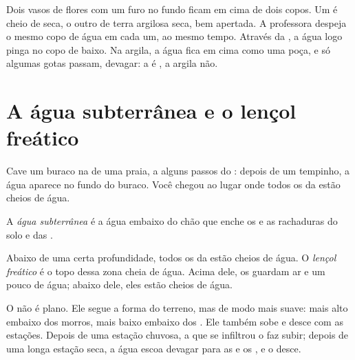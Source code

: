 \begin{inthelab}
Dois vasos de flores com um furo no fundo ficam em cima de dois copos. Um
é cheio de  seca, o outro de terra argilosa seca, bem apertada. A
professora despeja o mesmo copo de água em cada um, ao mesmo tempo. Através
da , a água logo pinga no copo de baixo. Na argila, a água fica em
cima como uma poça, e só algumas gotas passam, devagar: a  é
, a argila não.
\end{inthelab}

\section{A água subterrânea e o lençol freático}

Cave um buraco na  de uma praia, a alguns passos do : depois de um
tempinho, a água aparece no fundo do buraco. Você chegou ao lugar onde
todos os  da  estão cheios de água.

\begin{definition}\label{def:g6:water-underground:groundwater}
A \emph{água subterrânea} é a água embaixo do
chão que enche os  e as rachaduras do solo e das .
\end{definition}

\begin{definition}\label{def:g6:water-underground:water-table}
Abaixo de uma certa profundidade, todos os  da  estão cheios de
água. O \emph{lençol freático} é o topo dessa zona cheia de
água. Acima dele, os  guardam ar e um pouco de água; abaixo dele,
eles estão cheios de água.
\end{definition}

O  não é plano. Ele segue a forma do terreno, mas de modo
mais suave: mais alto embaixo dos morros, mais baixo embaixo dos .
Ele também sobe e desce com as estações. Depois de uma estação chuvosa, a
 que se infiltrou o faz subir; depois de uma longa estação seca, a
água escoa devagar para as  e os , e o  desce.

